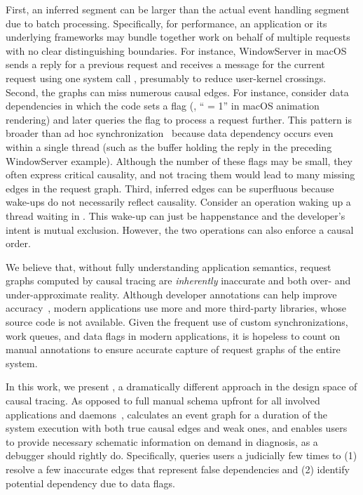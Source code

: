 First, an inferred segment can be larger than the actual event handling segment
due to batch processing. Specifically, for performance, an application or its
underlying frameworks may bundle together work on behalf of multiple requests
with no clear distinguishing boundaries. For instance, WindowServer in macOS
sends a reply for a previous request and receives a message for the current
request using one system call , presumably to
reduce user-kernel crossings. Second, the graphs can miss numerous causal
edges. For instance, consider data dependencies in which the code sets a flag
(\eg, `` = 1'' in macOS animation rendering) and later
queries the flag to process a request further. This pattern is broader than
ad hoc synchronization~\cite{xiong2010ad} because data dependency occurs
even within a single thread (such as the buffer holding the reply in the
preceding WindowServer example). Although the number of these flags may be
small, they often express critical causality, and not tracing them would lead
to many missing edges in the request graph. Third, inferred edges can be
superfluous because wake-ups do not necessarily reflect
causality. Consider an  operation waking up a thread waiting
in . This wake-up can just be happenstance and the developer's
intent is mutual exclusion. However, the two operations can also enforce a
causal order.

We believe that, without fully understanding application semantics, request
graphs computed by causal tracing are \emph{inherently} inaccurate and both
over- and under-approximate reality. Although developer annotations can help
improve accuracy~\cite{reynolds2006pip, fonseca2007x}, modern applications use
more and more third-party libraries, whose source code is not available. Given
the frequent use of custom synchronizations, work queues, and data flags in
modern applications, it is hopeless to count on manual annotations to ensure
accurate capture of request graphs of the entire system.

In this work, we present \xxx, a dramatically different approach in the design
space of causal tracing. As opposed to full manual schema upfront for
all involved applications and daemons~\cite{barham2004using, reynolds2006pip,
fonseca2007x}, \xxx calculates an event graph for a duration of the system
execution with both true causal edges and weak ones, 
and enables users to
provide necessary schematic information on demand in diagnosis,
as a debugger should rightly do. Specifically, \xxx queries users a
judicially few times to (1) resolve a few inaccurate edges that represent false
dependencies and (2) identify potential dependency due to data flags.

